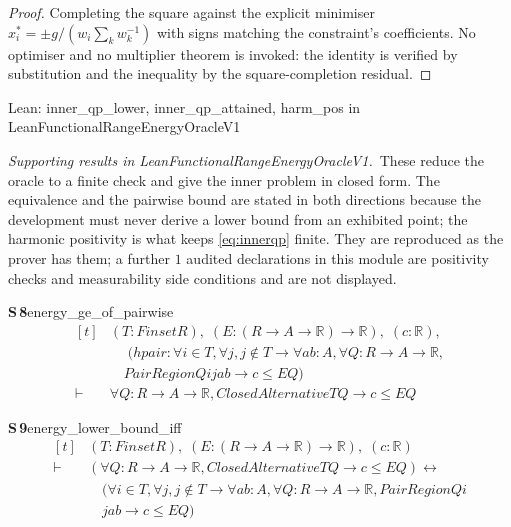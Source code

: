 \documentclass[conference]{IEEEtran}
\theoremstyle{definition}
\newcommand{\lean}[1]{\textsf{\footnotesize #1}}
\newcommand{\leanbox}[1]{%
  \par\vspace{2pt}\noindent
  {\footnotesize\textsf{Lean: #1}}\par\vspace{2pt}}
\begin{document}
\begin{proof}
Completing the square against the explicit minimiser
$x_{i}^{*}=\pm g/(w_{i}\sum_{k}w_{k}^{-1})$ with signs matching the constraint's
coefficients. No optimiser and no multiplier theorem is invoked: the identity is verified by
substitution and the inequality by the square-completion residual.
\end{proof}

\leanbox{\lean{inner\_qp\_lower}, \lean{inner\_qp\_attained}, \lean{harm\_pos} in
\lean{LeanFunctionalRangeEnergyOracleV1}}

\noindent\emph{Supporting results in \lean{LeanFunctionalRangeEnergyOracleV1}.}~These reduce the oracle to a finite check and give the inner problem in closed form. The equivalence and the pairwise bound are stated in both directions because the development must never derive a lower bound from an exhibited point; the harmonic positivity is what keeps \eqref{eq:innerqp} finite. They are reproduced as the prover has them; a further $1$ audited declarations in this module are positivity checks and measurability side conditions and are not displayed.

\noindent\textbf{S\,8}\quad\lean{energy\_ge\_of\_pairwise}
{\footnotesize\[ \begin{aligned}[t]
&(\mathit{T} : \mathit{Finset} \mathit{R}),\; (\mathit{E} : (\mathit{R} \to \mathit{A} \to \mathbb{R} ) \to \mathbb{R} ),\; (\mathit{c} : \mathbb{R} ),\\
&\quad \; (\mathit{hpair} : \forall \mathit{i} \in \mathit{T}, \forall \mathit{j}, \mathit{j} \notin \mathit{T} \to \forall \mathit{a} \mathit{b} : \mathit{A}, \forall \mathit{Q} : \mathit{R} \to \mathit{A} \to \mathbb{R} ,\\
&\quad \mathit{PairRegion} \mathit{Q} \mathit{i} \mathit{j} \mathit{a} \mathit{b} \to \mathit{c} \leq \mathit{E} \mathit{Q})\\
\vdash\;&\forall \mathit{Q} : \mathit{R} \to \mathit{A} \to \mathbb{R} , \mathit{ClosedAlternative} \mathit{T} \mathit{Q} \to \mathit{c} \leq \mathit{E} \mathit{Q}
\end{aligned} \]}

\noindent\textbf{S\,9}\quad\lean{energy\_lower\_bound\_iff}
{\footnotesize\[ \begin{aligned}[t]
&(\mathit{T} : \mathit{Finset} \mathit{R}),\; (\mathit{E} : (\mathit{R} \to \mathit{A} \to \mathbb{R} ) \to \mathbb{R} ),\; (\mathit{c} : \mathbb{R} )\\
\vdash\;&(\forall \mathit{Q} : \mathit{R} \to \mathit{A} \to \mathbb{R} , \mathit{ClosedAlternative} \mathit{T} \mathit{Q} \to \mathit{c} \leq \mathit{E} \mathit{Q}) \leftrightarrow\\
&\quad (\forall \mathit{i} \in \mathit{T}, \forall \mathit{j}, \mathit{j} \notin \mathit{T} \to \forall \mathit{a} \mathit{b} : \mathit{A}, \forall \mathit{Q} : \mathit{R} \to \mathit{A} \to \mathbb{R} , \mathit{PairRegion} \mathit{Q} \mathit{i}\\
&\quad \mathit{j} \mathit{a} \mathit{b} \to \mathit{c} \leq \mathit{E} \mathit{Q})
\end{aligned} \]}
\end{document}
